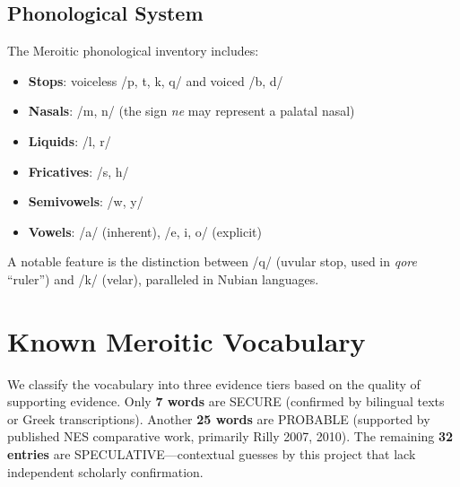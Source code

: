 \documentclass[11pt,a4paper]{article}
\begin{document}
\subsection{Phonological System}

The Meroitic phonological inventory includes:
\begin{itemize}[nosep]
  \item \textbf{Stops}: voiceless /p, t, k, q/ and voiced /b, d/
  \item \textbf{Nasals}: /m, n/ (the sign \textit{ne} may represent a palatal nasal)
  \item \textbf{Liquids}: /l, r/
  \item \textbf{Fricatives}: /s, h/
  \item \textbf{Semivowels}: /w, y/
  \item \textbf{Vowels}: /a/ (inherent), /e, i, o/ (explicit)
\end{itemize}

A notable feature is the distinction between /q/ (uvular stop, used in
\textit{qore} ``ruler'') and /k/ (velar), paralleled in Nubian languages.


\section{Known Meroitic Vocabulary}

We classify the vocabulary into three evidence tiers based on the quality of
supporting evidence. Only \textbf{7 words} are SECURE (confirmed by bilingual
texts or Greek transcriptions). Another \textbf{25 words} are PROBABLE
(supported by published NES comparative work, primarily Rilly 2007, 2010).
The remaining \textbf{32 entries} are SPECULATIVE---contextual guesses by
this project that lack independent scholarly confirmation.
\end{document}
